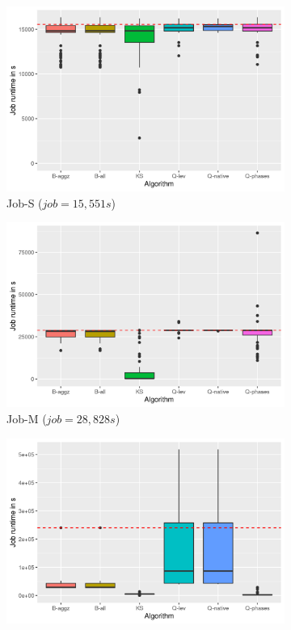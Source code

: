 \documentclass{jhps}
\begin{document}
\begin{figure}
\begin{subfigure}{0.31\textwidth}
\centering
\includegraphics[width=\textwidth]{job_similarities_4296426-out/jobs-elapsed}
\caption{Job-S ($job=15,551s$)}\label{fig:runtime-job-S}
\end{subfigure}
\begin{subfigure}{0.31\textwidth}
\centering
\includegraphics[width=\textwidth]{job_similarities_5024292-out/jobs-elapsed}
\caption{Job-M ($job=28,828s$)}\label{fig:runtime-job-M}
\end{subfigure}
\begin{subfigure}{0.31\textwidth}
\centering
\includegraphics[width=\textwidth]{job_similarities_7488914-out/jobs-elapsed}

\end{subfigure}
\end{figure}
\end{document}
